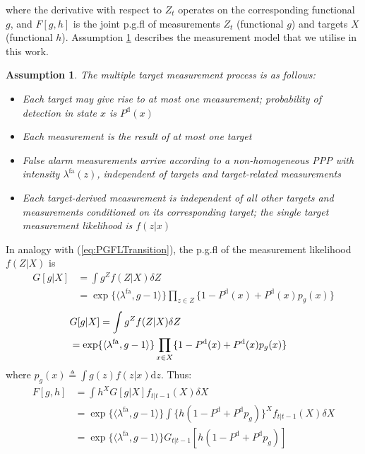 \documentclass[journal,twoside]{IEEEtran}
\theoremstyle{plain}
\newtheorem{assumption}{Assumption}
\begin{document}
\fi
%
where the derivative with respect to $Z_t$ operates on the corresponding functional $g$, and $F[g,h]$ is the joint p.g.fl of measurements $Z_t$ (functional $g$) and targets $X$ (functional $h$). Assumption \ref{ass:Measurement} describes the measurement model that we utilise in this work.
\begin{assumption}
The multiple target measurement process is as follows:
%
\begin{itemize}
\item Each target may give rise to at most one measurement; probability of detection in state $x$ is $P^{\mathrm{d}}(x)$
\item Each measurement is the result of at most one target
\item False alarm measurements arrive according to a non-homogeneous PPP with intensity $\lambda^\mathrm{fa}(z)$, independent of targets and target-related measurements
\item Each target-derived measurement is independent of all other targets and measurements conditioned on its corresponding target; the single target measurement likelihood is $f(z|x)$
\end{itemize}
\label{ass:Measurement}
\end{assumption}
In analogy with (\ref{eq:PGFLTransition}), the p.g.fl of the measurement likelihood $f(Z|X)$ is \cite[p422]{Mah07}
%
\ifCLASSOPTIONdraftcls
\begin{align}
G[g|X] &= \int{g^Z f(Z|X) \delta Z} \\
&= \exp\{\langle\lambda^\mathrm{fa},g-1\rangle\}\prod_{z\in Z}\{1-P^{\mathrm{d}}(x) + P^{\mathrm{d}}(x)p_g(x)\} \label{eq:PGFLMeasurement}
\end{align}
\else
\begin{align}
\lefteqn{G[g|X] = \int{g^Z f(Z|X) \delta Z}} \\
&= \exp\{\langle\lambda^\mathrm{fa},g-1\rangle\}\prod_{x\in X}\{1-P^{\mathrm{d}}(x) + P^{\mathrm{d}}(x)p_g(x)\} \label{eq:PGFLMeasurement}
\end{align}
\fi
%
where $p_g(x) \triangleq \int{g(z)f(z|x)\mathrm{d} z}$. Thus: \cite[p531]{Mah07}
%
\ifCLASSOPTIONdraftcls
\begin{align}
F[g,h] &= \int{h^X G[g|X] f_{t|t-1}(X)\delta X} \\
&= \exp\{\langle\lambda^\mathrm{fa},g-1\rangle\}\int{\{h(1-P^{\mathrm{d}} + P^{\mathrm{d}} p_g)\}^X f_{t|t-1}(X)\delta X} \\
&= \exp\{\langle\lambda^\mathrm{fa},g-1\rangle\} G_{t|t-1}[h(1-P^{\mathrm{d}} + P^{\mathrm{d}} p_g)] \label{eq:JointPGFL}
\end{align}
\end{document}
